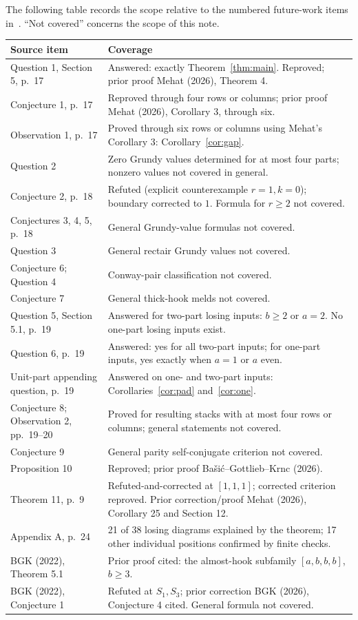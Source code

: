 \documentclass[11pt]{article}
\begin{document}
The following table records the scope relative to the numbered future-work
items in~\cite{BGK}. ``Not covered'' concerns the scope of this note.
\begingroup\small
\begin{longtable}{p{}p{}}
\toprule
Source item & Coverage\\
\midrule
Question 1, Section 5, p.~17 & Answered: exactly Theorem~\ref{thm:main}.
Reproved; prior proof Mehat (2026), Theorem 4.\\
Conjecture 1, p.~17 & Reproved through four rows or columns; prior proof
Mehat (2026), Corollary 3, through six.\\
Observation 1, p.~17 & Proved through six rows or columns using Mehat's
Corollary 3: Corollary~\ref{cor:gap}.\\
Question 2 & Zero Grundy values determined for at most four parts;
nonzero values not covered in general.\\
Conjecture 2, p.~18 & Refuted (explicit counterexample $r=1,k=0$);
boundary corrected to $1$. Formula for $r\ge2$ not covered.\\
Conjectures 3, 4, 5, p.~18 & General Grundy-value formulas not covered.\\
Question 3 & General rectair Grundy values not covered.\\
Conjecture 6; Question 4 & Conway-pair classification not covered.\\
Conjecture 7 & General thick-hook melds not covered.\\
Question 5, Section 5.1, p.~19 & Answered for two-part losing inputs:
$b\ge2$ or $a=2$. No one-part losing inputs exist.\\
Question 6, p.~19 & Answered: yes for all two-part inputs;
for one-part inputs, yes exactly when $a=1$ or $a$ even.\\
Unit-part appending question, p.~19 & Answered on one- and two-part inputs:
Corollaries~\ref{cor:pad} and~\ref{cor:one}.\\
Conjecture 8; Observation 2, pp.~19--20 & Proved for resulting stacks with
at most four rows or columns; general statements not covered.\\
Conjecture 9 & General parity self-conjugate criterion not covered.\\
Proposition 10 & Reproved; prior proof Ba\v{s}i\'c--Gottlieb--Krnc (2026).\\
Theorem 11, p.~9 & Refuted-and-corrected at $[1,1,1]$; corrected criterion
reproved. Prior correction/proof Mehat (2026), Corollary 25 and Section 12.\\
Appendix A, p.~24 & 21 of 38 losing diagrams explained by the theorem;
17 other individual positions confirmed by finite checks.\\
BGK (2022), Theorem 5.1 & Prior proof cited: the almost-hook subfamily
$[a,b,b,b]$, $b\ge3$.\\
BGK (2022), Conjecture 1 & Refuted at $S_1,S_3$; prior correction
BGK (2026), Conjecture 4 cited. General formula not covered.\\
\bottomrule
\end{longtable}
\endgroup
\end{document}
